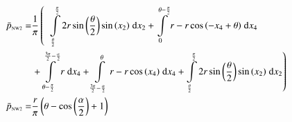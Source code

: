 \begin{align}
    \bar{p}_{\text{\tiny{NW2}}} =&\frac{1}{\pi} \left(\;\;\int\limits_{\frac{\theta}{2}}^{\frac{\pi}{2}}2 r \sin{\left (\frac{\theta}{2} \right )} \sin{\left (x_{2} \right )}\;\mathrm{d}x_{2}+\int\limits_{0}^{\theta - \frac{\pi}{2}}r - r \cos{\left (- x_{4} + \theta \right )}\;\mathrm{d}x_{4}\right.\notag\\
 &\left.+\int\limits_{\theta - \frac{\pi}{2}}^{\frac{3 \pi}{2} - \frac{\alpha}{2}}r\;\mathrm{d}x_{4}+\int\limits_{\frac{3 \pi}{2} - \frac{\alpha}{2}}^{\theta}r - r \cos{\left (x_{4} \right )}\;\mathrm{d}x_{4}+\int\limits_{\frac{\theta}{2}}^{\frac{\pi}{2}}2 r \sin{\left (\frac{\theta}{2} \right )} \sin{\left (x_{2} \right )}\;\mathrm{d}x_{2}\right)\label{pNW2Def}\\
    \bar{p}_{\text{\tiny{NW2}}}  =& \frac{r}{\pi} \left(\theta - \cos{\left (\frac{\alpha}{2} \right )} + 1\right)\label{pNW2Sln}
\end{align}